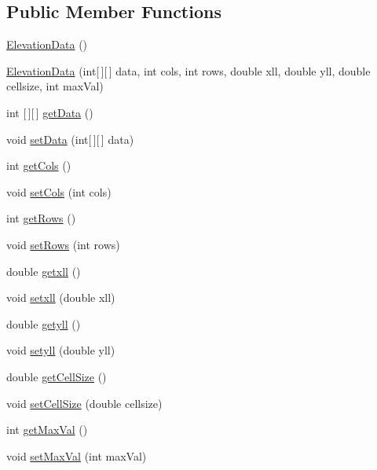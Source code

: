 \subsection*{Public Member Functions}
\begin{DoxyCompactItemize}
\item 
\hyperlink{classbridges_1_1data__src__dependent_1_1_elevation_data_aee584cdeb39194b0fd82f91f1281c989}{Elevation\+Data} ()
\item 
\hyperlink{classbridges_1_1data__src__dependent_1_1_elevation_data_a5bb0de11a5d9d9564431aff839c5bb85}{Elevation\+Data} (int\mbox{[}$\,$\mbox{]}\mbox{[}$\,$\mbox{]} data, int cols, int rows, double xll, double yll, double cellsize, int max\+Val)
\item 
int \mbox{[}$\,$\mbox{]}\mbox{[}$\,$\mbox{]} \hyperlink{classbridges_1_1data__src__dependent_1_1_elevation_data_ab7847f85409b8af94b85ea7023a46b2d}{get\+Data} ()
\item 
void \hyperlink{classbridges_1_1data__src__dependent_1_1_elevation_data_ad9cf1900457e918d847cea8055d6bfa3}{set\+Data} (int\mbox{[}$\,$\mbox{]}\mbox{[}$\,$\mbox{]} data)
\item 
int \hyperlink{classbridges_1_1data__src__dependent_1_1_elevation_data_aecd53a0d628fc595ce7f45d5cdd0d5c9}{get\+Cols} ()
\item 
void \hyperlink{classbridges_1_1data__src__dependent_1_1_elevation_data_a13b37ddf4aaddba84aaf047f0371032e}{set\+Cols} (int cols)
\item 
int \hyperlink{classbridges_1_1data__src__dependent_1_1_elevation_data_a06732017ff4427e36ecf583155a776fd}{get\+Rows} ()
\item 
void \hyperlink{classbridges_1_1data__src__dependent_1_1_elevation_data_a10c6df66f391797f389d97084bbf5ac3}{set\+Rows} (int rows)
\item 
double \hyperlink{classbridges_1_1data__src__dependent_1_1_elevation_data_a2a4af898ef5d7f5fefe09efcfb520850}{getxll} ()
\item 
void \hyperlink{classbridges_1_1data__src__dependent_1_1_elevation_data_a75ad5cc47b65deadc5905820c7c1749d}{setxll} (double xll)
\item 
double \hyperlink{classbridges_1_1data__src__dependent_1_1_elevation_data_a3dbade4bcd0a18c967bea1291d4a7be1}{getyll} ()
\item 
void \hyperlink{classbridges_1_1data__src__dependent_1_1_elevation_data_a5a047e02c5d0acf9bf6d4b45086ae1cc}{setyll} (double yll)
\item 
double \hyperlink{classbridges_1_1data__src__dependent_1_1_elevation_data_a7fba378d6a2c9f4e9723bd07fa697902}{get\+Cell\+Size} ()
\item 
void \hyperlink{classbridges_1_1data__src__dependent_1_1_elevation_data_a504abfe58c55baff68e7b1d17ae991e5}{set\+Cell\+Size} (double cellsize)
\item 
int \hyperlink{classbridges_1_1data__src__dependent_1_1_elevation_data_a041124e8005f06ad475627b1abd75c4e}{get\+Max\+Val} ()
\item 
void \hyperlink{classbridges_1_1data__src__dependent_1_1_elevation_data_a1942cae209312b44dac10436966eb4d0}{set\+Max\+Val} (int max\+Val)
\end{DoxyCompactItemize}


